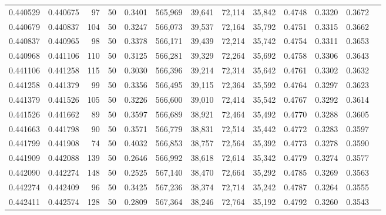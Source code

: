 \begin{tabular}{rrrrrrrrrrrrr}
0.440529 & 0.440675 &    97 &  50 &                                     0.3401 & 565,969 &  39,641 &  72,114 &  35,842 & 0.4748 & 0.3320 & 0.3672 \\
0.440679 & 0.440837 &   104 &  50 &                                     0.3247 & 566,073 &  39,537 &  72,164 &  35,792 & 0.4751 & 0.3315 & 0.3662 \\
0.440837 & 0.440965 &    98 &  50 &                                     0.3378 & 566,171 &  39,439 &  72,214 &  35,742 & 0.4754 & 0.3311 & 0.3653 \\
0.440968 & 0.441106 &   110 &  50 &                                     0.3125 & 566,281 &  39,329 &  72,264 &  35,692 & 0.4758 & 0.3306 & 0.3643 \\
0.441106 & 0.441258 &   115 &  50 &                                     0.3030 & 566,396 &  39,214 &  72,314 &  35,642 & 0.4761 & 0.3302 & 0.3632 \\
0.441258 & 0.441379 &    99 &  50 &                                     0.3356 & 566,495 &  39,115 &  72,364 &  35,592 & 0.4764 & 0.3297 & 0.3623 \\
0.441379 & 0.441526 &   105 &  50 &                                     0.3226 & 566,600 &  39,010 &  72,414 &  35,542 & 0.4767 & 0.3292 & 0.3614 \\
0.441526 & 0.441662 &    89 &  50 &                                     0.3597 & 566,689 &  38,921 &  72,464 &  35,492 & 0.4770 & 0.3288 & 0.3605 \\
0.441663 & 0.441798 &    90 &  50 &                                     0.3571 & 566,779 &  38,831 &  72,514 &  35,442 & 0.4772 & 0.3283 & 0.3597 \\
0.441799 & 0.441908 &    74 &  50 &                                     0.4032 & 566,853 &  38,757 &  72,564 &  35,392 & 0.4773 & 0.3278 & 0.3590 \\
0.441909 & 0.442088 &   139 &  50 &                                     0.2646 & 566,992 &  38,618 &  72,614 &  35,342 & 0.4779 & 0.3274 & 0.3577 \\
0.442090 & 0.442274 &   148 &  50 &                                     0.2525 & 567,140 &  38,470 &  72,664 &  35,292 & 0.4785 & 0.3269 & 0.3563 \\
0.442274 & 0.442409 &    96 &  50 &                                     0.3425 & 567,236 &  38,374 &  72,714 &  35,242 & 0.4787 & 0.3264 & 0.3555 \\
0.442411 & 0.442574 &   128 &  50 &                                     0.2809 & 567,364 &  38,246 &  72,764 &  35,192 & 0.4792 & 0.3260 & 0.3543 \\

\end{tabular}
